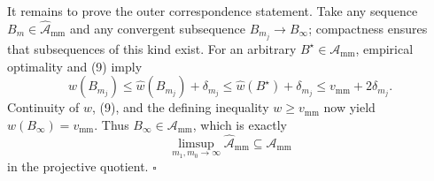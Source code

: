 It remains to prove the outer correspondence statement.  Take any sequence \(B_m\in\widehat{\mathcal A}_{\mathrm{mm}}\) and any convergent subsequence \(B_{m_j}\to B_\infty\); compactness ensures that subsequences of this kind exist.  For an arbitrary \(B^\star\in\mathcal A_{\mathrm{mm}}\), empirical optimality and (9) imply
\[
 w(B_{m_j})
 \le \widehat w(B_{m_j})+\delta_{m_j}
 \le \widehat w(B^\star)+\delta_{m_j}
 \le v_{\mathrm{mm}}+2\delta_{m_j}.
 \tag{11}
\]
Continuity of \(w\), (9), and the defining inequality \(w\ge v_{\mathrm{mm}}\) now yield \(w(B_\infty)=v_{\mathrm{mm}}\).  Thus \(B_\infty\in\mathcal A_{\mathrm{mm}}\), which is exactly
\[
 \limsup_{m_1,m_0\to\infty}\widehat{\mathcal A}_{\mathrm{mm}}
 \subseteq\mathcal A_{\mathrm{mm}}
\]
in the projective quotient. \(\square\)
